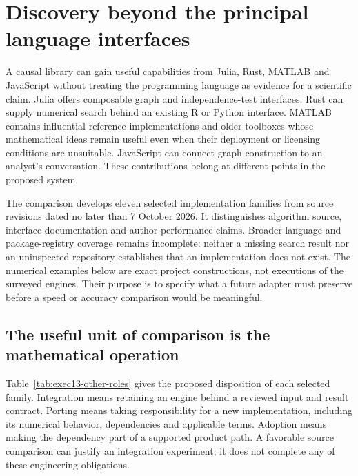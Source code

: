 \section{Discovery beyond the principal language interfaces}
\label{exec13:other-discovery}

A causal library can gain useful capabilities from Julia, Rust, MATLAB and
JavaScript without treating the programming language as evidence for a
scientific claim. Julia offers composable graph and independence-test
interfaces. Rust can supply numerical search behind an existing R or Python
interface. MATLAB contains influential reference implementations and older
toolboxes whose mathematical ideas remain useful even when their deployment
or licensing conditions are unsuitable. JavaScript can connect graph
construction to an analyst's conversation. These contributions belong at
different points in the proposed system.

The comparison develops eleven selected implementation families from source
revisions dated no later than 7 October 2026. It distinguishes algorithm
source, interface documentation and author performance claims. Broader
language and package-registry coverage remains incomplete: neither a missing
search result nor an uninspected repository establishes that an implementation
does not exist. The numerical examples below are exact project constructions,
not executions of the surveyed engines. Their purpose is to specify what a
future adapter must preserve before a speed or accuracy comparison would be
meaningful.

\subsection{The useful unit of comparison is the mathematical operation}

Table~\ref{tab:exec13-other-roles} gives the proposed disposition of each
selected family. Integration means retaining an engine behind a reviewed
input and result contract. Porting means taking responsibility for a new
implementation, including its numerical behavior, dependencies and applicable
terms. Adoption means making the dependency part of a supported product
path. A favorable source comparison can justify an integration experiment;
it does not complete any of these engineering obligations.

